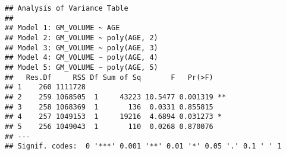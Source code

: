 \documentclass[
]{article}
\newenvironment{Shaded}{\begin{snugshade}}{\end{snugshade}}
\newcommand{\DecValTok}[1]{\textcolor[rgb]{0.00,0.00,0.81}{#1}}
\newcommand{\FunctionTok}[1]{\textcolor[rgb]{0.00,0.00,0.00}{#1}}
\newcommand{\NormalTok}[1]{#1}
\newcommand{\OtherTok}[1]{\textcolor[rgb]{0.56,0.35,0.01}{#1}}
\newcommand{\SpecialCharTok}[1]{\textcolor[rgb]{0.00,0.00,0.00}{#1}}
\begin{document}
\begin{verbatim}
## Analysis of Variance Table
## 
## Model 1: GM_VOLUME ~ AGE
## Model 2: GM_VOLUME ~ poly(AGE, 2)
## Model 3: GM_VOLUME ~ poly(AGE, 3)
## Model 4: GM_VOLUME ~ poly(AGE, 4)
## Model 5: GM_VOLUME ~ poly(AGE, 5)
##   Res.Df     RSS Df Sum of Sq       F   Pr(>F)   
## 1    260 1111728                                 
## 2    259 1068505  1     43223 10.5477 0.001319 **
## 3    258 1068369  1       136  0.0331 0.855815   
## 4    257 1049153  1     19216  4.6894 0.031273 * 
## 5    256 1049043  1       110  0.0268 0.870076   
## ---
## Signif. codes:  0 '***' 0.001 '**' 0.01 '*' 0.05 '.' 0.1 ' ' 1
\end{verbatim}

\begin{Shaded}
\end{Shaded}
\end{document}
